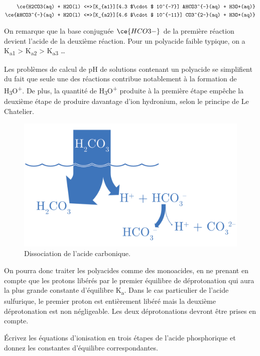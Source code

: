 \documentclass[
  11pt,
  french,
  a4paper,
  openany]{book}
\begin{document}
\[
\begin{split}
\ce{H2CO3(aq) + H2O(l) <=>[K_{a1}][4.3 $\cdot$ 10^{-7}] &HCO3^{-}(aq) + H3O+(aq)} \\
\ce{&HCO3^{-}(aq) + H2O(l) <=>[K_{a2}][4.6 $\cdot$ 10^{-11}] CO3^{2-}(aq) + H3O+(aq)}
\end{split}
\]

On remarque que la base conjuguée \(\ce{HCO3-}\) de la première réaction devient l'acide de la deuxième réaction. Pour un polyacide faible typique, on a K\textsubscript{a1} \textgreater{} K\textsubscript{a2} \textgreater{} K\textsubscript{a3} \ldots{}

Les problèmes de calcul de pH de solutions contenant un polyacide se simplifient du fait que seule une des réactions contribue notablement à la formation de H\textsubscript{3}O\textsuperscript{+}. De plus, la quantité de H\textsubscript{3}O\textsuperscript{+} produite à la première étape empêche la deuxième étape de produire davantage d'ion hydronium, selon le principe de Le Chatelier.

\begin{figure}

{\centering \includegraphics[width=0.5\linewidth]{images/acides-faibles-2} 

}

\caption{Dissociation de l'acide carbonique.}\label{fig:acides-faibles-2}
\end{figure}

On pourra donc traiter les polyacides comme des monoacides, en ne prenant en compte que les protons libérés par le premier équilibre de déprotonation qui aura la plus grande constante d'équilibre K\textsubscript{a}. Dans le cas particulier de l'acide sulfurique, le premier proton est entièrement libéré mais la deuxième déprotonation est non négligeable. Les deux déprotonations devront être prises en compte.

\begin{Exercise}
Écrivez les équations d'ionisation en trois étapes de l'acide phosphorique et donnez les constantes d'équilibre correspondantes.

\end{Exercise}
\end{document}
